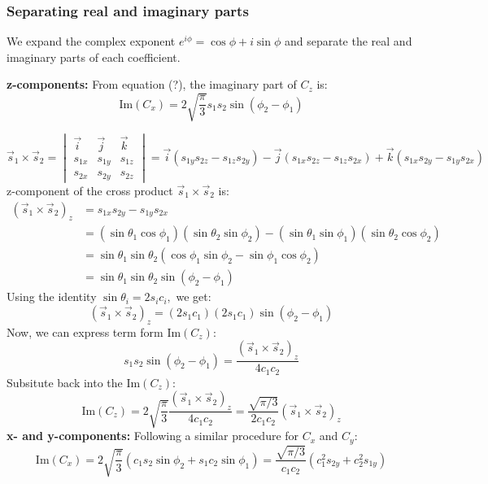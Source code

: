 \documentclass[12pt]{article}
\begin{document}
	\subsubsection{Separating real and imaginary parts}
	We expand the complex exponent $e^{i \phi} = \cos \phi + i \sin \phi$ and separate the real and imaginary parts of each coefficient.

	\textbf{z-components:} From equation (?), the imaginary part of $C_z$ is:
	\[
	\text{Im}(C_x) = 2 \sqrt{\frac{\pi}{3}} s_1 s_2 \sin(\phi_2 - \phi_1)
	\]

	\[
	\vec{s}_1 \times \vec{s}_2 = \begin{vmatrix}
		\vec{i} & \vec{j}  & \vec{k}  \\
		s_{1x} & s_{1y} & s_{1z} \\
		s_{2x} & s_{2y} & s_{2z}
	\end{vmatrix} = \vec{i} (s_{1y} s_{2z} - s_{1z} s_{2y}) - \vec{j} (s_{1x} s_{2z} - s_{1z} s_{2x}) + \vec{k} (s_{1x} s_{2y} - s_{1y} s_{2x})
	\]
	z-component of the cross product $\vec{s}_1 \times \vec{s}_2$ is:
	\[
	\begin{aligned}
	(\vec{s}_1 \times \vec{s}_2)_z &= s_{1x} s_{2y} - s_{1y} s_{2x} \\
	&=(\sin \theta_1 \cos \phi_1)(\sin \theta_2 \sin \phi_2) - (\sin \theta_1 \sin \phi_1)(\sin \theta_2 \cos \phi_2) \\
	&= \sin \theta_1 \sin \theta_2 \left(\cos \phi_1 \sin \phi_2 - \sin \phi_1 \cos \phi_2\right) \\
	&= \sin \theta_1 \sin \theta_2 \sin (\phi_2 - \phi_1)
	\end{aligned}
	\]
	Using the identity $\sin \theta_i = 2 s_i c_i,$ we get:
	\[
	(\vec{s}_1 \times \vec{s}_2)_z = \left(2 s_1 c_1\right) \left(2 s_1 c_1\right) \sin \left(\phi_2 - \phi_1\right)
	\]
	Now, we can express term form $\text{Im}(C_z)$:
	\[
	s_1 s_2 \sin \left(\phi_2 - \phi_1\right) = \frac{(\vec{s}_1 \times \vec{s}_2)_z}{4 c_1 c_2}
	\]
	Subsitute back into the $\text{Im}(C_z)$:
	\[
	\text{Im}(C_z) = 2 \sqrt{\frac{\pi}{3}} \frac{(\vec{s}_1 \times \vec{s}_2)_z}{4 c_1 c_2} = \frac{\sqrt{\pi/3}}{2 c_1 c_2}(\vec{s}_1 \times \vec{s}_2)_z
	\]
	\textbf{x- and y-components:} Following a similar procedure for $C_x$ and $C_y$:
	\[
	\text{Im}(C_x) = 2 \sqrt{\frac{\pi}{3}} \left(c_1 s_2 \sin \phi_2 + s_1 c_2 \sin \phi_1\right) = \frac{\sqrt{\pi/3}}{c_1 c_2} \left(c_1^2 s_{2y} + c_2^2 s_{1y}\right)
	\]
\end{document}

